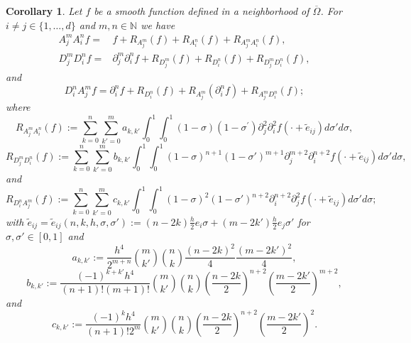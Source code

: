 \documentclass[11pt,oneside,leqno]{amsart}
\numberwithin{equation}{section}
\numberwithin{equation}{section}
\newtheorem{corollary}[theorem]{Corollary}
\begin{document}
\begin{corollary}\label{cor:difference:average}
Let $f$ be a smooth function defined in a neighborhood of $\overline{\Omega}$. For 
$i\ne j\in\{ 1,\ldots,d\}$ and $m,n\in\mathbb{N}$ we have 
\begin{equation}
    \begin{split}
        A_{j}^{m}A_{i}^{n}f=&f+R_{A_{j}^{m}}(f)+R_{A_{i}^{n}}(f)+R_{A_{j}^{m}A_{i}^{n}}(f),\\
        D_{j}^{m}D_{i}^{n}f=&\partial_{j}^{m}\partial_{i}^{n}f+R_{D_{j}^{m}}(f)+R_{D_{i}^{n}}(f)+R_{D_{j}^{m}D_{i}^{n}}(f),
    \end{split}
\end{equation}
and 
\begin{equation}
D_{i}^{n}A_{j}^{m}f=\partial_{i}^{n}f+R_{D_{i}^{n}}(f)+R_{A_{j}^{m}}(\partial^{n}_{i}f)+R_{A_{j}^{m}D_{i}^{n}}(f);
\end{equation}
where
\begin{equation*}
    R_{A^{m}_{j}A^{n}_{i}}(f):=\sum_{k=0}^{n}\sum_{k'=0}^{m}a_{k,k'}\int_{0}^{1}\int_{0}^{1}(1-\sigma)(1-\sigma^{\prime})\partial_{j}^{2}\partial_{i}^{2}f\left(\cdot+\tilde{e}_{ij}\right)d\sigma'd\sigma,
\end{equation*}
\begin{equation*}
    R_{D^{m}_{j}D^{n}_{i}}(f):=\sum_{k=0}^{n}\sum_{k'=0}^{m}b_{k,k'}\int_{0}^{1}\int_{0}^{1}(1-\sigma)^{n+1}(1-\sigma')^{m+1}\partial_{j}^{m+2}\partial_{i}^{n+2}f\left(\cdot+\tilde{e}_{ij}\right)d\sigma'd\sigma,
\end{equation*}
 and
 \begin{equation*}
    R_{D^{n}_{i}A^{m}_{j}}(f):=\sum_{k=0}^{n}\sum_{k'=0}^{m}c_{k,k'}\int_{0}^{1}\int_{0}^{1}(1-\sigma)^{2}(1-\sigma')^{n+2}\partial_{i}^{n+2}\partial_{j}^{2}f\left(\cdot+\tilde{e}_{ij}\right)d\sigma'd\sigma;
\end{equation*}
with $\tilde{e}_{ij}=\tilde{e}_{ij}(n,k,h,\sigma,\sigma'):=(n-2k)\frac{h}{2}e_{i}\sigma+(m-2k')\frac{h}{2}e_{j}\sigma'$ for $\sigma,\sigma'\in[0,1]$ and  $$a_{k,k'}:=\frac{h^{4}}{2^{m+n}}\binom{m}{k'}\binom{n}{k}\frac{(n-2k)^{2}}{4}\frac{(m-2k')^{2}}{4},$$
$$b_{k,k'}:=\frac{(-1)^{k+k'}h^{4}}{(n+1)!(m+1)!}\binom{m}{k'}\binom{n}{k}\left(\frac{n-2k}{2}\right)^{n+2}\left(\frac{m-2k'}{2}\right)^{m+2},$$
and 
$$c_{k,k'}:=\frac{(-1)^{k}h^{4}}{(n+1)!2^{m}}\binom{m}{k'}\binom{n}{k}\left(\frac{n-2k}{2}\right)^{n+2}\left(\frac{m-2k'}{2}\right)^{2}.$$
\end{corollary}
\end{document}
